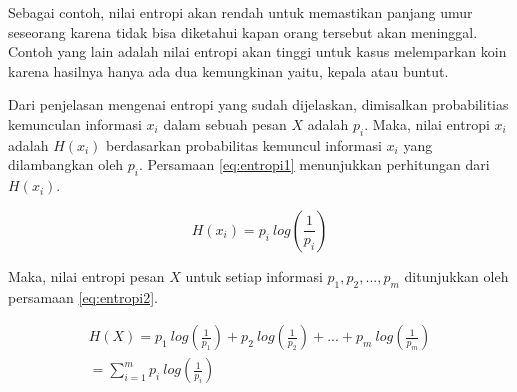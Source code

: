 Sebagai contoh, nilai entropi akan rendah untuk memastikan panjang umur seseorang karena tidak bisa diketahui kapan orang tersebut akan meninggal. Contoh yang lain adalah nilai entropi akan tinggi untuk kasus melemparkan koin karena hasilnya hanya ada dua kemungkinan yaitu, kepala atau buntut.

Dari penjelasan mengenai entropi yang sudah dijelaskan, dimisalkan probabilitias kemunculan informasi \begin{math}x_i\end{math} dalam sebuah pesan \begin{math}X\end{math} adalah \begin{math}p_i\end{math}. Maka, nilai entropi $x_i$ adalah \begin{math}H(x_i)\end{math} berdasarkan probabilitas kemuncul informasi $x_i$ yang dilambangkan oleh $p_i$. Persamaan \ref{eq:entropi1} menunjukkan perhitungan dari $H(x_i)$.

\begin{equation}
	H(x_i) = p_i\: log(\frac{1}{p_i})
	\label{eq:entropi1}
\end{equation}

Maka, nilai entropi pesan \begin{math}X\end{math} untuk setiap informasi \begin{math}p_1, p_2, ..., p_m\end{math} ditunjukkan oleh persamaan \ref{eq:entropi2}.

\begin{gather}
	H(X) = p_1\: log(\frac{1}{p_1}) + p_2\: log(\frac{1}{p_2}) + ... + p_m\: log(\frac{1}{p_m}) \nonumber \\
	 = \sum\limits_{i=1}^m p_i\: log(\frac{1}{p_i})
	\label{eq:entropi2}
\end{gather}